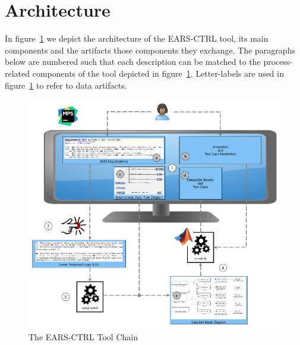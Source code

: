 \section{Architecture}
\vspace{-.3cm}In figure~\ref{fig:ears_ctrl_toolchain} we depict the architecture
of the \textsf{EARS-CTRL} tool, its main components and the artifacts those
components they exchange. The paragraphs below are numbered such that each
description can be matched to the process-related components of the tool depicted in
figure~\ref{fig:ears_ctrl_toolchain}.
Letter-labels are used in figure~\ref{fig:ears_ctrl_toolchain} to refer to data
artifacts.\vspace{-.3cm}
\begin{figure}[h!] 
   \begin{center}
     \includegraphics[width=.9\textwidth]{images/toolchain.png}
     \vspace{-.3cm}
     \caption{The \textsf{EARS-CTRL} Tool Chain}
     \label{fig:ears_ctrl_toolchain}
   \end{center}
      \vspace{-1cm}
 \end{figure}
\vspace{0cm}
